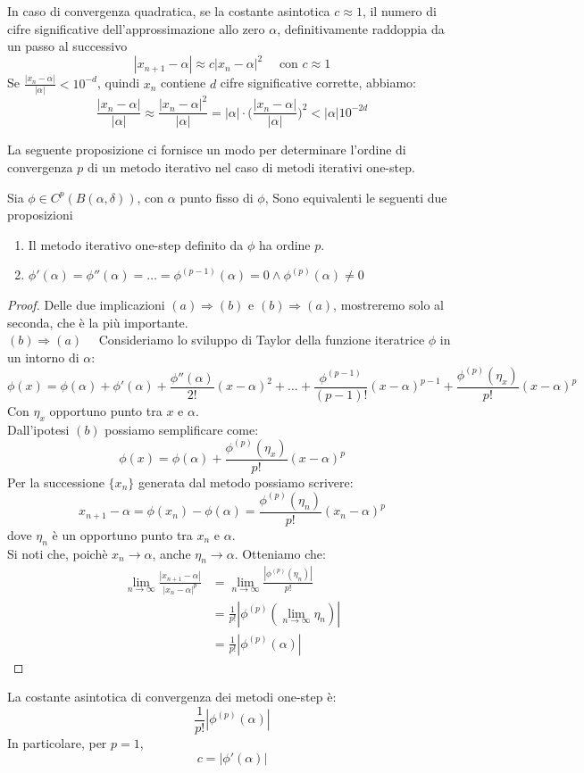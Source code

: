 \documentclass[12pt]{report}
\newcounter{proposition}
\begin{document}
\begin{note}{}{}
	In caso di convergenza quadratica, se la costante asintotica $c \approx 1$, il numero di cifre significative dell'approssimazione allo zero $\alpha$, definitivamente raddoppia da un passo al successivo
	\[
	|x_{n+1}-\alpha|\approx c |x_n - \alpha|^2 \quad \text{ con } c \approx 1
	\]
	Se $\frac{|x_n-\alpha|}{|\alpha|} < 10^{-d}$, quindi $x_n$ contiene $d$ cifre significative corrette, abbiamo:
	\[
	\frac{|x_n-\alpha|}{|\alpha|} \approx \frac{|x_n - \alpha|^2}{|\alpha|} = |\alpha|\cdot\Bigg(\frac{|x_n-\alpha|}{|\alpha|}\Bigg)^2 < |\alpha|10^{-2d}
	\]
\end{note}
La seguente proposizione ci fornisce un modo per  determinare l'ordine di convergenza $p$ di un metodo iterativo nel caso di metodi iterativi one-step.
\begin{proposition}{}{}
	Sia $\phi \in C^p(B(\alpha, \delta))$, con $\alpha$ punto fisso di $\phi$, Sono equivalenti le seguenti due proposizioni
	\begin{enumerate}[label=(\alph*)]
		\item Il metodo iterativo one-step definito da $\phi$ ha ordine $p$.
		\item $\phi'(\alpha)=\phi''(\alpha) = \dots = \phi^{(p-1)}(\alpha) = 0 \wedge \phi^{(p)}(\alpha) \neq 0$
	\end{enumerate}
\end{proposition}
\begin{proof}
	Delle due implicazioni $(a) \Rightarrow (b)$ e $(b) \Rightarrow (a)$, mostreremo solo al seconda, che è la più importante. \\
	$(b) \Rightarrow (a) \quad$ Consideriamo lo sviluppo di Taylor della funzione iteratrice $\phi$ in un intorno di $\alpha$:
	\[
	\phi(x) = \phi(\alpha) + \phi'(\alpha) + \frac{\phi''(\alpha)}{2!}(x-\alpha)^2 + \dots + \frac{\phi^{(p-1)}}{(p-1)!}(x-\alpha)^{p-1} + \frac{\phi^{(p)}(\eta_x)}{p!}(x-\alpha)^p
	\]
	Con $\eta_x$ opportuno punto tra $x$ e $\alpha$. \\
	Dall'ipotesi $(b)$ possiamo semplificare come:
	\[
	\phi(x) = \phi(\alpha) + \frac{\phi^{(p)}(\eta_x)}{p!}(x-\alpha)^p
	\]
	Per la successione $\{x_n\}$ generata dal metodo possiamo scrivere:
	\[
	x_{n+1} - \alpha = \phi(x_n) - \phi(\alpha) = \frac{\phi^{(p)}(\eta_n)}{p!}(x_n - \alpha)^p
	\]
	dove $\eta_n$ è un opportuno punto tra $x_n$ e $\alpha$. \\
	Si noti che, poichè $x_n \to \alpha$, anche $\eta_n \to \alpha$. Otteniamo che:
	\begin{align*}
		\lim\limits_{n\to\infty}\frac{|x_{n+1} - \alpha|}{|x_n - \alpha|^p} &= \lim\limits_{n\to\infty}\frac{|\phi^{(p)}(\eta_n)|}{p!} \\
		&= \frac{1}{p!}|\phi^{(p)}(\lim\limits_{n\to\infty}\eta_n)| \\
		&= \frac{1}{p!}|\phi^{(p)}(\alpha)|
	\end{align*}
\end{proof}
\begin{note}{}{}
	La costante asintotica di convergenza dei metodi one-step è:
	\[
	\frac{1}{p!}|\phi^{(p)}(\alpha)|
	\]
	In particolare, per $p =1$,
	\[
	c = |\phi'(\alpha)|
	\]
\end{note}
\end{document}
